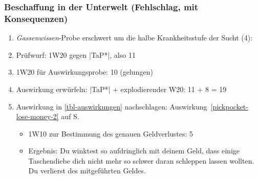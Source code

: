 \subsubsection{Beschaffung in der Unterwelt (Fehlschlag, mit Konsequenzen)}
\begin{enumerate}
	\item \emph{Gassenwissen}-Probe erschwert um die halbe Krankheitsstufe der Sucht (4): 
	\item Prüfwurf: 1W20 gegen |TaP*|, also 11
	\item 1W20 für Auswirkungsprobe: 10 (gelungen)
	\item Auswirkung erwürfeln: |TaP*| + explodierender W20: 11 + 8 = 19
	\item Auswirkung in \vref{tbl-auswirkungen} nachschlagen: Auswirkung~\ref{pickpocket-lose-money-2} auf S.~\pageref{pickpocket-lose-money-2}
	\begin{itemize}
		\item 1W10 zur Bestimmung des genauen Geldverlustes: 5
		\item Ergebnis: Du winktest so aufdringlich mit deinem Geld, dass einige Taschendiebe dich nicht mehr so schwer daran schleppen lassen wollten. Du verlierst  des mitgeführten Geldes.
	\end{itemize}
\end{enumerate}

